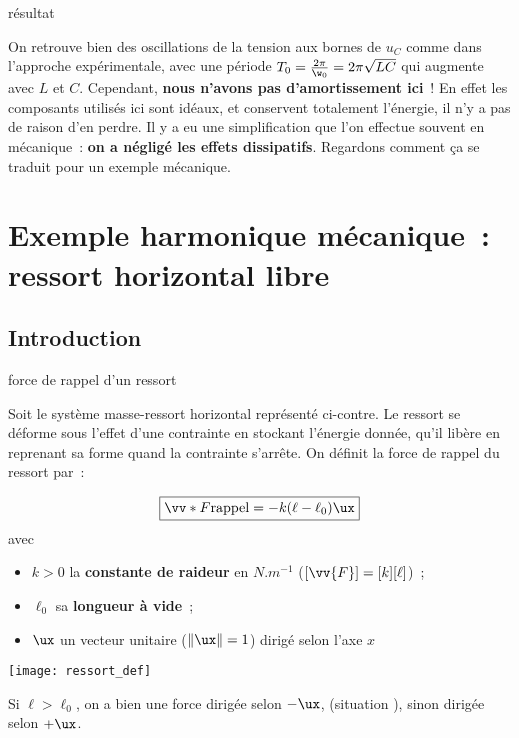 \documentclass[../main/main.tex]{subfiles}
\begin{document}
\begin{impo}[label=impo:amortissement]{résultat}

    On retrouve bien des oscillations de la tension aux bornes de $u_C$ comme
    dans l'approche expérimentale, avec une période $T_0 = \frac{2\pi}{\w_0} =
    2\pi\sqrt{LC}$ qui augmente avec $L$ et $C$. Cependant, \textbf{nous n'avons
    pas d'amortissement ici}~! En effet les composants utilisés ici sont idéaux,
    et conservent totalement l'énergie, il n'y a pas de raison d'en perdre. Il y
    a eu une simplification que l'on effectue souvent en mécanique~: \textbf{on
    a négligé les effets dissipatifs}. Regardons comment ça se traduit pour un
    exemple mécanique.

\end{impo}

\section{Exemple harmonique mécanique~: ressort horizontal libre}

\subsection{Introduction}

\begin{defi}[label=defi:ressortdef, sidebyside, righthand ratio=.5]{force de
    rappel d'un ressort}

    Soit le système masse-ressort horizontal représenté ci-contre. Le ressort se
    déforme sous l'effet d'une contrainte en stockant l'énergie donnée, qu'il
    libère en reprenant sa forme quand la contrainte s'arrête. On définit la
    force de rappel du ressort par~:

    \begin{equation*}
        \boxed{\vv*{F}{\rm rappel} = -k(\ell - \ell_0)\ux}
    \end{equation*}
    avec

    \begin{itemize}
        \item $k > 0$ la \textbf{constante de raideur} en $\si{N.m^{-1}}$
            ($[\vv{F}] = [k][\ell]$)~;
        \item $\ell_0$ sa \textbf{longueur à vide}~;
        \item $\ux$ un vecteur unitaire ($ \left\Vert \ux \right\Vert = 1$)
            dirigé selon l'axe $x$
    \end{itemize}

    \tcblower
    \begin{center}
        \texttt{[image: ressort\_def]}
    \end{center}

    Si $\ell > \ell_0$, on a bien une force dirigée selon $-\ux$, (situation
    ), sinon dirigée selon $+\ux$.

\end{defi}
\end{document}
